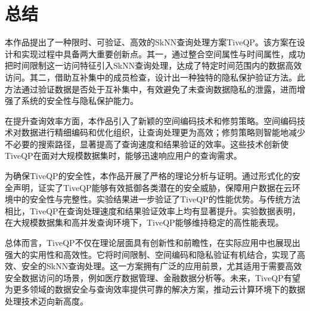 \documentclass{cumcmthesis}
\numberwithin{equation}{section} %
\numberwithin{figure}{section} %
\numberwithin{table}{section} %
\begin{document}
\newpage

\section{总结}
本作品提出了一种限时、可验证、高效的SkNN查询处理方案TiveQP。该方案在设计和实现过程中具备两大重要创新点。其一，通过整合空间属性与时间属性，成功把时间限制这一访问特征引入SkNN查询处理，达成了特定时间范围内的数据高效访问。其二，借助互补集中的成员检查，设计出一种独特的隐私保护验证方法。此方法通过验证数据是否处于互补集中，有效避免了未查询数据隐私的泄露，进而增强了系统的安全性与隐私保护能力。

在提升查询效率方面，本作品引入了新颖的空间编码技术和修剪策略。空间编码技术对数据进行精细编码和优化组织，让查询处理更为高效；修剪策略则智能地减少不必要的搜索路径，显著提高了查询速度和结果验证的效率。这些技术创新使TiveQP在面对大规模数据集时，能够迅速响应用户的查询需求。

为确保TiveQP的安全性，本作品开展了严格的理论分析与证明。通过形式化的安全声明，证实了TiveQP能够有效抵御各类潜在的安全威胁，保障用户数据在云环境中的安全性与完整性。实验结果进一步验证了TiveQP的性能优势。与传统方法相比，TiveQP在查询处理速度和结果验证效率上均有显著提升。实验数据表明，在大规模数据集和高并发查询环境下，TiveQP能够维持稳定的高性能表现。

总体而言，TiveQP不仅在理论层面具有创新性和前瞻性，在实际应用中也展现出强大的实用性和高效性。它将时间限制、空间编码和隐私验证有机结合，实现了高效、安全的SkNN查询处理。这一方案拥有广泛的应用前景，尤其适用于需要高效安全数据访问的场景，例如医疗数据管理、金融数据分析等。未来，TiveQP有望为更多领域的数据安全与查询效率提供可靠的解决方案，推动云计算环境下的数据处理技术迈向新高度。

\end{document}
